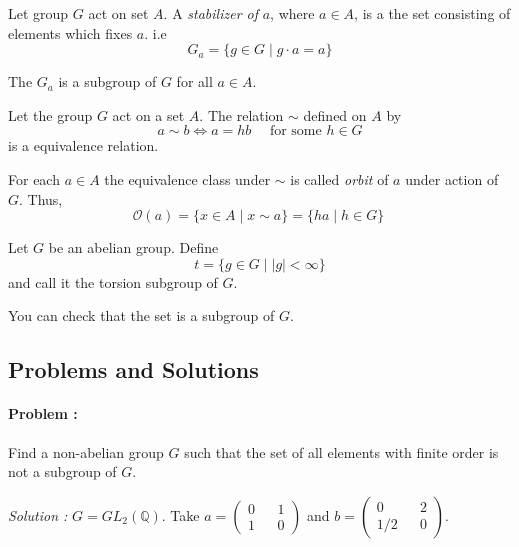\begin{definition}
    Let group $G$ act on set $A$. 
    A \textit{stabilizer of} $a$, where $a \in A$, is a the set consisting of elements
    which fixes $a$. i.e
    \[ G_a = \{ g \in G \mid g \cdot a = a \} \]
\end{definition}

\begin{proposition}
    The $G_a$ is a subgroup of $G$ for all $a \in A$.
\end{proposition}

\begin{proposition}
    Let the group $G$ act on a set $A$.             
    The relation $\sim$ defined on $A$ by 
    \[ a \sim b \iff a = hb \quad \text{ for some } h \in G\]
    is a equivalence relation.
\end{proposition}

\begin{definition}
    For each $a \in A$ the equivalence class under $\sim$ is called
    \textit{orbit} of $a$ under action of $G$. Thus,
    \[ \mathcal{O}(a) = \{ x \in A \mid x \sim a \} = \{ ha \mid h \in G \}\ \]
\end{definition}

\begin{definition}
    Let $G$ be an abelian group. Define
    \[ t=\{ g \in G \mid |g| < \infty \} \]
    and call it the torsion subgroup of $G$.
\end{definition}

You can check that the set is a subgroup of $G$.

\eject

\subsection*{Problems and Solutions}

\paragraph{Problem :} Find a non-abelian group $G$ such that the set of all elements with finite order is not a subgroup of $G$.

\vspace{4mm}
\textit{Solution :} $G=GL_2({\mathbb{Q}})$.
Take $a=\begin{pmatrix}
    0 && 1 \\
    1 && 0 
\end{pmatrix}$ 
and 
$b = \begin{pmatrix}
    0 && 2 \\
    1/2 && 0
\end{pmatrix}$.

